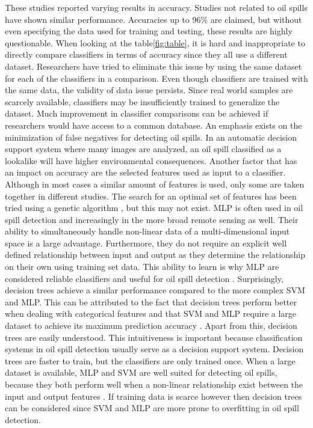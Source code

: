 These studies reported varying results in accuracy. Studies not related to oil spills have shown similar performance. Accuracies up to 96\% are claimed\cite{Topouzelis200924}, but without even specifying the data used for training and testing, these results are highly questionable. When looking at the table\ref{fig:table}, it is hard and inappropriate to directly compare classifiers in terms of accuracy since they all use a different dataset. Researchers have tried to eliminate this issue by using the same dataset for each of the classifiers in a comparison\cite{Mera201472}\cite{Xu201414}. Even though classifiers are trained with the same data, the validity of data issue persists. Since real world samples are scarcely available, classifiers may be insufficiently trained to generalize the dataset. Much improvement in classifier comparisons can be achieved if researchers would have access to a common database\cite{Topouzelis200810}.
An emphasis exists on the minimization of false negatives for detecting oil spills. In an automatic decision support system where many images are analyzed, an oil spill classified as a lookalike will have higher environmental consequences. Another factor that has an impact on accuracy are the selected features used as input to a classifier. Although in most cases a similar amount of features is used, only some are taken together in different studies. The search for an optimal set of features has been tried using a genetic algorithm \cite{Topouzelis200930}, but this may not exist.
MLP is often used in oil spill detection and increasingly in the more broad remote sensing as well. Their ability to simultaneously handle non-linear data of a multi-dimensional input space is a large advantage. Furthermore, they do not require an explicit well defined relationship between input and output as they determine the relationship on their own using training set data. This ability to learn is why MLP are considered reliable classifiers and useful for oil spill detection \cite{Delfrate200038}. Surprisingly, decision trees achieve a similar performance compared to the more complex SVM and MLP. This can be attributed to the fact that decision trees perform better when dealing with categorical features and that SVM and MLP require a large dataset to achieve its maximum prediction accuracy \cite{kotsiantis2007supervised}. Apart from this, decision trees are easily understood. This intuitiveness is important because classification systems in oil spill detection usually serve as a decision support system. Decision trees are faster to train, but the classifiers are only trained once. When a large dataset is available, MLP and SVM are well suited for detecting oil spills, because they both perform well when a non-linear relationship exist between the input and output features \cite{kotsiantis2007supervised}. If training data is scarce however then decision trees can be considered since SVM and MLP are more prone to overfitting in oil spill detection\cite{Xu201414}.
